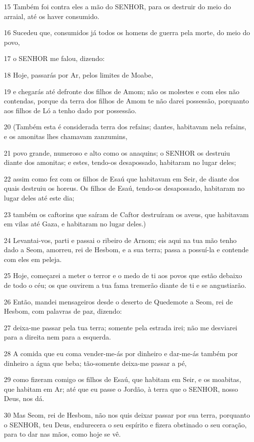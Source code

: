 \par 15 Também foi contra eles a mão do SENHOR, para os destruir do meio do arraial, até os haver consumido.
\par 16 Sucedeu que, consumidos já todos os homens de guerra pela morte, do meio do povo,
\par 17 o SENHOR me falou, dizendo:
\par 18 Hoje, passarás por Ar, pelos limites de Moabe,
\par 19 e chegarás até defronte dos filhos de Amom; não os molestes e com eles não contendas, porque da terra dos filhos de Amom te não darei possessão, porquanto aos filhos de Ló a tenho dado por possessão.
\par 20 (Também esta é considerada terra dos refains; dantes, habitavam nela refains, e os amonitas lhes chamavam zanzumins,
\par 21 povo grande, numeroso e alto como os anaquins; o SENHOR os destruiu diante dos amonitas; e estes, tendo-os desapossado, habitaram no lugar deles;
\par 22 assim como fez com os filhos de Esaú que habitavam em Seir, de diante dos quais destruiu os horeus. Os filhos de Esaú, tendo-os desapossado, habitaram no lugar deles até este dia;
\par 23 também os caftorins que saíram de Caftor destruíram os aveus, que habitavam em vilas até Gaza, e habitaram no lugar deles.)
\par 24 Levantai-vos, parti e passai o ribeiro de Arnom; eis aqui na tua mão tenho dado a Seom, amorreu, rei de Hesbom, e a sua terra; passa a possuí-la e contende com eles em peleja.
\par 25 Hoje, começarei a meter o terror e o medo de ti aos povos que estão debaixo de todo o céu; os que ouvirem a tua fama tremerão diante de ti e se angustiarão.
\par 26 Então, mandei mensageiros desde o deserto de Quedemote a Seom, rei de Hesbom, com palavras de paz, dizendo:
\par 27 deixa-me passar pela tua terra; somente pela estrada irei; não me desviarei para a direita nem para a esquerda.
\par 28 A comida que eu coma vender-me-ás por dinheiro e dar-me-ás também por dinheiro a água que beba; tão-somente deixa-me passar a pé,
\par 29 como fizeram comigo os filhos de Esaú, que habitam em Seir, e os moabitas, que habitam em Ar; até que eu passe o Jordão, à terra que o SENHOR, nosso Deus, nos dá.
\par 30 Mas Seom, rei de Hesbom, não nos quis deixar passar por sua terra, porquanto o SENHOR, teu Deus, endurecera o seu espírito e fizera obstinado o seu coração, para to dar nas mãos, como hoje se vê.
